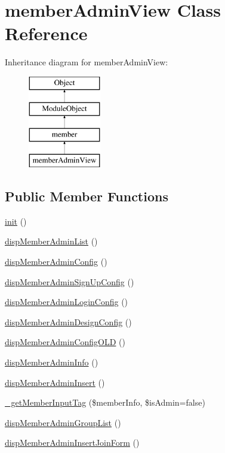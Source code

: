 \hypertarget{classmemberAdminView}{\section{member\+Admin\+View Class Reference}
\label{classmemberAdminView}
}
Inheritance diagram for member\+Admin\+View\+:\begin{figure}[H]
\begin{center}
\leavevmode
\includegraphics[height=4.000000cm]{classmemberAdminView}
\end{center}
\end{figure}
\subsection*{Public Member Functions}
\begin{DoxyCompactItemize}
\item 
\hyperlink{classmemberAdminView_abfcff5343cc06cfa70fa1994b8a77d05}{init} ()
\item 
\hyperlink{classmemberAdminView_ab234e23e8317000c0f1722ab0f54ab99}{disp\+Member\+Admin\+List} ()
\item 
\hyperlink{classmemberAdminView_a8b5394bc1e9e1aae78bfaccad8e0edc9}{disp\+Member\+Admin\+Config} ()
\item 
\hyperlink{classmemberAdminView_af3ab8ea3d555e7e685c6c4706e3ea545}{disp\+Member\+Admin\+Sign\+Up\+Config} ()
\item 
\hyperlink{classmemberAdminView_a98debda6b76587e3633453e68c58a955}{disp\+Member\+Admin\+Login\+Config} ()
\item 
\hyperlink{classmemberAdminView_ab9f3ed7d905d09ea8ad49acdc22fe326}{disp\+Member\+Admin\+Design\+Config} ()
\item 
\hyperlink{classmemberAdminView_ad609a62a6d1aa8ec0c33fb6e30e20f08}{disp\+Member\+Admin\+Config\+O\+L\+D} ()
\item 
\hyperlink{classmemberAdminView_a9e87c4fbbb859f2557457b1935453dd4}{disp\+Member\+Admin\+Info} ()
\item 
\hyperlink{classmemberAdminView_ad7a3311686a49ab70e318fb66736258a}{disp\+Member\+Admin\+Insert} ()
\item 
\hyperlink{classmemberAdminView_a49f5bc2cf86576c040abfb686c21383b}{\+\_\+get\+Member\+Input\+Tag} (\$member\+Info, \$is\+Admin=false)
\item 
\hyperlink{classmemberAdminView_a4a1e4b416515bdcdb1459f44398eb412}{disp\+Member\+Admin\+Group\+List} ()
\item 
\hyperlink{classmemberAdminView_a049d24f5adc0c5eb534902e44944ff08}{disp\+Member\+Admin\+Insert\+Join\+Form} ()
\end{DoxyCompactItemize}
